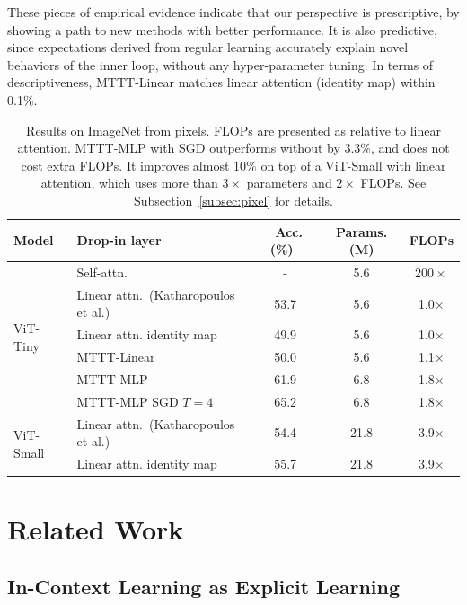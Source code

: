 \documentclass{article} %
\begin{document}
These pieces of empirical evidence indicate that our perspective is prescriptive, by showing a path to new methods with better performance. 
It is also predictive, since expectations derived from regular learning accurately explain novel behaviors of the inner loop, without any hyper-parameter tuning.
In terms of descriptiveness, MTTT-Linear matches linear attention (identity map) within 0.1\%.


\begin{table}
\vspace{-1ex}
\centering
\begin{tabular}{|l|l|c|c|c|}
\toprule
Model
& Drop-in layer
& ~Acc. (\%)~
& {\footnotesize Params. (M)}
& {\small FLOPs}
\\
\midrule
\multirow{6}{*}{\parbox{1cm}{ViT-Tiny}} 
& Self-attn.~{\tiny \citep{beyer2022better}} 
& - & 5.6 & $200\times$ \\
& Linear attn.~{\tiny (Katharopoulos et al.)}
& 53.7 & 5.6 & 1.0$\times$ \\
& Linear attn. identity map
& 49.9 & 5.6 & 1.0$\times$ \\
\cmidrule(lr){2-5}
& MTTT-Linear 
& 50.0 & 5.6 & 1.1$\times$ \\
& MTTT-MLP
& 61.9 & 6.8 & 1.8$\times$ \\
& MTTT-MLP SGD $T=4$
& 65.2 & 6.8 & 1.8$\times$ \\
\midrule
\multirow{2}{*}{\parbox{1cm}{ViT-Small}} 
& Linear attn.~{\tiny (Katharopoulos et al.)}
& 54.4 & 21.8 & 3.9$\times$ \\
& Linear attn. identity map
& 55.7 & 21.8 & 3.9$\times$ \\
\bottomrule
\end{tabular}
\caption{
Results on ImageNet from pixels. FLOPs are presented as relative to linear attention.
MTTT-MLP with SGD outperforms without by 3.3\%, and does not cost extra FLOPs.
It improves almost 10\% on top of a ViT-Small with linear attention, which uses more than $3\times$ parameters and $2\times$ FLOPs.
See Subsection~\ref{subsec:pixel} for details.
}
\vspace{-1ex}
\label{tab:pixel}
\end{table}

\section{Related Work}
\label{sec:rel}

\subsection{In-Context Learning as Explicit Learning}
\label{subsec:rel-inc}
\end{document}

